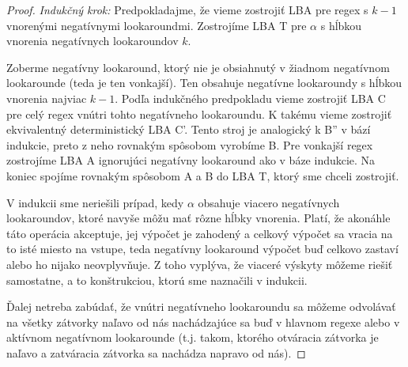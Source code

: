 \begin{proof}
\textit{Indukčný krok:} Predpokladajme, že vieme zostrojiť LBA pre regex s $k-1$ vnorenými negatívnymi lookaroundmi. Zostrojíme LBA T pre $\alpha$ s hĺbkou vnorenia negatívnych lookaroundov $k$.

Zoberme negatívny lookaround, ktorý nie je obsiahnutý v žiadnom negatívnom look\-arounde (teda je ten vonkajší). Ten obsahuje negatívne lookaroundy s hĺbkou vnorenia najviac $k-1$. Podľa indukčného predpokladu vieme zostrojiť LBA C pre celý regex vnútri tohto negatívneho lookaroundu. K takému vieme zostrojiť ekvivalentný deterministický LBA C'. Tento stroj je analogický k B'' v bází indukcie, preto z neho rovnakým spôsobom vyrobíme B. Pre vonkajší regex zostrojíme LBA A ignorujúci negatívny lookaround ako v báze indukcie. Na koniec spojíme rovnakým spôsobom A a B do LBA T, ktorý sme chceli zostrojiť.
\\ \par
V indukcii sme neriešili prípad, kedy $\alpha$ obsahuje viacero negatívnych lookaroundov, ktoré navyše môžu mať rôzne hĺbky vnorenia. Platí, že akonáhle táto operácia akceptuje, jej výpočet je zahodený a celkový výpočet sa vracia na to isté miesto na vstupe, teda negatívny lookaround výpočet buď celkovo zastaví alebo ho nijako neovplyvňuje. Z toho vyplýva, že viaceré výskyty môžeme riešiť samostatne, a to konštrukciou, ktorú sme naznačili v indukcii.

Ďalej netreba zabúdať, že vnútri negatívneho lookaroundu sa môžeme odvolávať na všetky zátvorky naľavo od nás nachádzajúce sa buď v hlavnom regexe alebo v aktívnom negatívnom lookarounde (t.j. takom, ktorého otváracia zátvorka je naľavo a zatváracia zátvorka sa nachádza napravo od nás).
\end{proof}

